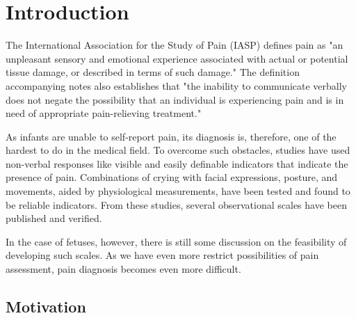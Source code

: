 \documentclass[msc]{ppgccufmg}
\begin{document}

\chapter{Introduction}

The International Association for the Study of Pain (IASP) defines pain as "an unpleasant sensory and emotional experience associated with actual or potential tissue damage, or described in terms of such damage." The definition accompanying notes also establishes that "the inability to communicate verbally does not negate the possibility that an individual is experiencing pain and is in need of appropriate pain-relieving treatment."

As infants are unable to self-report pain, its diagnosis is, therefore, one of the hardest to do in the medical field. To overcome such obstacles, studies have used non-verbal responses like visible and easily definable indicators that indicate the presence of pain. Combinations of crying with facial expressions, posture, and movements, aided by physiological measurements, have been tested and found to be reliable indicators. From these studies, several observational scales have been published and verified. 

In the case of fetuses, however, there is still some discussion on the feasibility of developing such scales. As we have even more restrict possibilities of pain assessment, pain diagnosis becomes even more difficult.

\section{Motivation}
\end{document}
